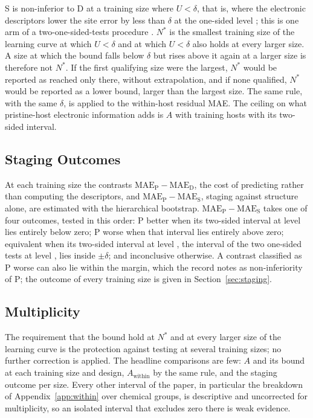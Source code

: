 S is non-inferior to D at a training size where $U < \delta$, that is, where the electronic descriptors lower the site error by less than $\delta$ at the one-sided level \numCfgAnalysisNStarAlpha{}; this is one arm of a two-one-sided-tests procedure \citep{Schuirmann1987comparison,Lakens2017equivalence}. $N^{*}$ is the smallest training size of the learning curve at which $U < \delta$ and at which $U < \delta$ also holds at every larger size. A size at which the bound falls below $\delta$ but rises above it again at a larger size is therefore not $N^{*}$. If the first qualifying size were the largest, $N^{*}$ would be reported as reached only there, without extrapolation, and if none qualified, $N^{*}$ would be reported as a lower bound, larger than the largest size. The same rule, with the same $\delta$, is applied to the within-host residual MAE. The ceiling on what pristine-host electronic information adds is $A$ with \numCfgAnalysisCTwoCeilingBudget{} training hosts with its two-sided interval.

\subsection{Staging Outcomes}

At each training size the contrasts $\mathrm{MAE}_\mathrm{P} - \mathrm{MAE}_\mathrm{D}$, the cost of predicting rather than computing the descriptors, and $\mathrm{MAE}_\mathrm{P} - \mathrm{MAE}_\mathrm{S}$, staging against structure alone, are estimated with the hierarchical bootstrap. $\mathrm{MAE}_\mathrm{P} - \mathrm{MAE}_\mathrm{S}$ takes one of four outcomes, tested in this order: P better when its two-sided interval at level \numCfgAnalysisStagingNullCi{} lies entirely below zero; P worse when that interval lies entirely above zero; equivalent when its two-sided interval at level \numCfgAnalysisEquivalenceTostCi{}, the interval of the two one-sided tests at level \numCfgAnalysisNStarAlpha{}, lies inside $\pm\delta$; and inconclusive otherwise. A contrast classified as P worse can also lie within the margin, which the record notes as non-inferiority of P; the outcome of every training size is given in Section~\ref{sec:staging}.

\subsection{Multiplicity}

The requirement that the bound hold at $N^{*}$ and at every larger size of the learning curve is the protection against testing at several training sizes; no further correction is applied. The headline comparisons are few: $A$ and its bound at each training size and design, $A_\mathrm{within}$ by the same rule, and the staging outcome per size. Every other interval of the paper, in particular the breakdown of Appendix~\ref{app:within} over chemical groups, is descriptive and uncorrected for multiplicity, so an isolated interval that excludes zero there is weak evidence.
